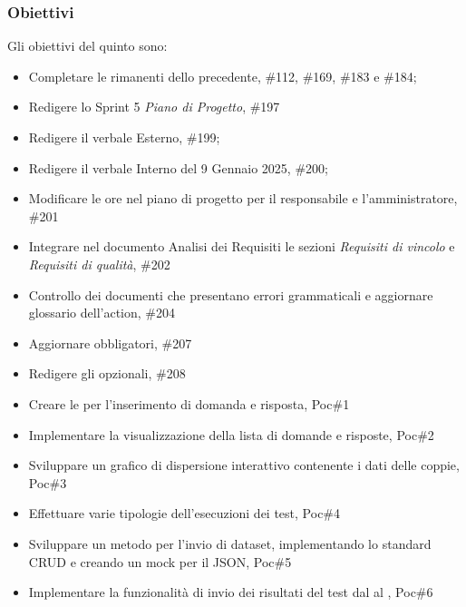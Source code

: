 \subsubsection{Obiettivi}
Gli obiettivi del quinto  sono:
\begin{itemize}
    \item Completare le  rimanenti dello  precedente,  \#112, \#169, \#183 e \#184;
    \item Redigere lo Sprint 5 \textit{Piano di Progetto},  \#197
    \item Redigere il verbale Esterno,  \#199;
    \item Redigere il verbale Interno del 9 Gennaio 2025,  \#200;
    \item Modificare le ore nel piano di progetto per il responsabile e l’amministratore,  \#201
    \item Integrare nel documento Analisi dei Requisiti le sezioni \textit{Requisiti di vincolo} e \textit{Requisiti di qualità},  \#202
    \item Controllo dei documenti che presentano errori grammaticali e aggiornare glossario dell'action,  \#204
    \item Aggiornare  obbligatori,  \#207
    \item Redigere gli  opzionali,  \#208
    \item Creare le  per l'inserimento di domanda e risposta,  Poc\#1
    \item Implementare la visualizzazione della lista di domande e risposte,  Poc\#2
    \item Sviluppare un grafico di dispersione interattivo contenente i dati delle coppie,  Poc\#3
    \item Effettuare varie tipologie dell'esecuzioni dei test,  Poc\#4
    \item Sviluppare un metodo per l’invio di dataset, implementando lo standard CRUD e creando un mock per il JSON,  Poc\#5
    \item Implementare la funzionalità di invio dei risultati del test dal  al ,  Poc\#6
\end{itemize}